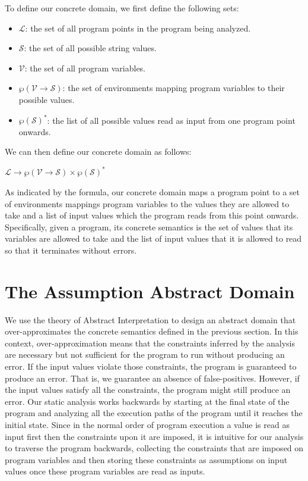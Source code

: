 \documentclass[10pt]{report}
\begin{document}
To define our concrete domain, we first define the following sets:
\begin{itemize}
	\item $\mathcal{L}$: the set of all program points in the program being analyzed. 
	\item $\mathcal{S}$: the set of all possible string values. 
	\item $\mathcal{V}$: the set of all program variables.
	\item$\wp(\mathcal{V} \rightarrow \mathcal{S})$: the set of environments mapping program variables to their possible values. 
	\item $\wp(\mathcal{S})^{*}$: the list of all possible values read as input from one program point onwards.  
\end{itemize}

We can then define our concrete domain as follows: 
\begin{center}
$\mathcal{L} \rightarrow \wp(\mathcal{V} \rightarrow \mathcal{S}) \times \wp(\mathcal{S})^{*}$
\end{center}

As indicated by the formula, our  concrete domain maps a program point to a set of environments mappings program variables to the values they are allowed to take and a list of input values which the program reads from this point onwards. Specifically, given a program, its concrete semantics is the set of values that its variables are allowed to take and the list of input values that it is allowed to read so that it terminates without errors.   

\section{The Assumption Abstract Domain} \label{assumption-domain}
We use the theory of Abstract Interpretation \cite{cousot} to design an abstract domain that over-approximates the concrete semantics defined in the previous section. In this context, over-approximation means that the constraints inferred by the analysis are necessary but not sufficient for the program to run without producing an error. If the input values violate those constraints, the program is guaranteed to produce an error. That is, we guarantee an absence of false-positives. However, if the input values satisfy all the constraints, the program might still produce an error. Our static analysis works backwards by starting at the final state of the program and analyzing all the execution paths of the program until it reaches the initial state. Since in the normal order of program execution a value is read as input first then the constraints upon it are imposed, it is intuitive for our analysis to traverse the program backwards, collecting the constraints that are imposed on program variables and then storing these constraints as assumptions on input values once these program variables are read as inputs. 
\end{document}
